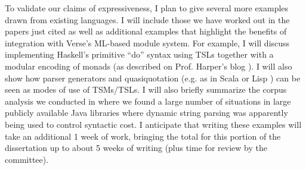 To validate our claims of expressiveness, I plan to give several more examples drawn from existing languages. I will include those we have worked out in the papers just cited as well as additional examples that highlight the benefits of integration with Verse's ML-based module system. For example, I will discuss implementing Haskell's primitive ``do'' syntax using TSLs together with a modular encoding of monads (as described on Prof. Harper's blog \cite{SML/Monads}). I will also show how parser generators and quasiquotation (e.g. as in Scala \cite{shabalin2013quasiquotes} or Lisp \cite{Bawd99a}) can be seen as modes of use of TSMs/TSLs. I will also briefly summarize the corpus analysis we conducted in \cite{TSLs} where we found a large number of  situations in large publicly available Java libraries where dynamic string parsing was apparently being used to control syntactic cost. I anticipate that writing these examples will take an additional 1 week of work, bringing the total for this portion of the dissertation up to about 5 weeks of writing (plus time for review by the committee). %



